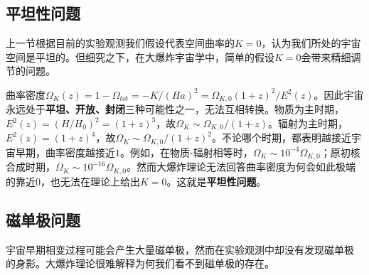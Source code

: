 \subsection{平坦性问题}
上一节根据目前的实验观测我们假设代表空间曲率的$K=0$，认为我们所处的宇宙空间是平坦的。但细究之下，在大爆炸宇宙学中，简单的假设$K=0$会带来精细调节的问题。

曲率密度$\Omega_K(z) =
1-\Omega_{tot}=-K /{\left(Ha\right)}^2=\Omega_{K,
0}{\left(1+z\right)}^2
/E^2(z)$。因此宇宙永远处于\textbf{平坦、开放、封闭}三种可能性之一，无法互相转换。物质为主时期，$E^2(z)={\left(H
/H_0\right)}^2={\left(1+z\right)}^3$，故$\Omega_K\sim \Omega_{K,
0}
/{\left(1+z\right)}$。辐射为主时期，$E^2(z)={\left(1+z\right)}^{4}$，故$\Omega_K\sim\Omega_{K,
0}
/{\left(1+z\right)}^2$。不论哪个时期，都表明越接近宇宙早期，曲率密度越接近$1$。例如，在物质-辐射相等时，$\Omega_K\sim
10^{-4}\Omega_{K, 0}$；原初核合成时期，$\Omega_K\sim 10^{-16}\Omega_{K,
0}$。然而大爆炸理论无法回答曲率密度为何会如此极端的靠近$0$，也无法在理论上给出$K=0$。这就是\textbf{平坦性问题}。

\subsection{磁单极问题}
宇宙早期相变过程可能会产生大量磁单极，然而在实验观测中却没有发现磁单极
的身影。大爆炸理论很难解释为何我们看不到磁单极的存在。
